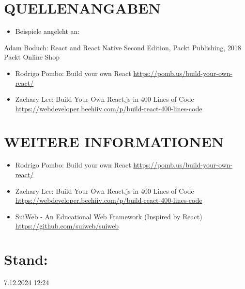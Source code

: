 \documentclass[10pt]{article}
\begin{document}
\section*{QUELLENANGABEN}
\begin{itemize}
  \item Beispiele angeleht an:
\end{itemize}

Adam Boduch: React and React Native Second Edition, Packt Publishing, 2018 Packt Online Shop

\begin{itemize}
  \item Rodrigo Pombo: Build your own React \href{https://pomb.us/build-your-own-react/}{https://pomb.us/build-your-own-react/}
  \item Zachary Lee: Build Your Own React.js in 400 Lines of Code \href{https://webdeveloper.beehiiv.com/p/build-react-400-lines-code}{https://webdeveloper.beehiiv.com/p/build-react-400-lines-code}
\end{itemize}

\section*{WEITERE INFORMATIONEN}
\begin{itemize}
  \item Rodrigo Pombo: Build your own React \href{https://pomb.us/build-your-own-react/}{https://pomb.us/build-your-own-react/}
  \item Zachary Lee: Build Your Own React.js in 400 Lines of Code \href{https://webdeveloper.beehiiv.com/p/build-react-400-lines-code}{https://webdeveloper.beehiiv.com/p/build-react-400-lines-code}
  \item SuiWeb - An Educational Web Framework (Inspired by React) \href{https://github.com/suiweb/suiweb}{https://github.com/suiweb/suiweb}
\end{itemize}

\section*{Stand:}
7.12.2024 12:24
\end{document}
